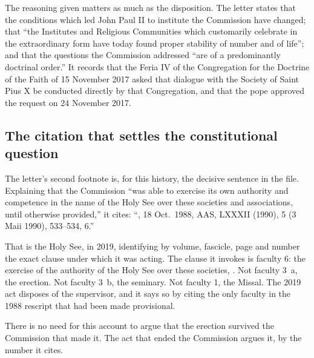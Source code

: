 The reasoning given matters as much as the disposition. The letter states
that the conditions which led John Paul II to institute the Commission
have changed; that ``the Institutes and Religious Communities which
customarily celebrate in the extraordinary form have today found proper
stability of number and of life''; and that the questions the Commission
addressed ``are of a predominantly doctrinal order.'' It records that the
Feria IV of the Congregation for the Doctrine of the Faith of 15 November
2017 asked that dialogue with the Society of Saint Pius X be conducted
directly by that Congregation, and that the pope approved the request on
24 November 2017.

\subsection{The citation that settles the constitutional question}

The letter's second footnote is, for this history, the decisive
sentence in the file. Explaining that the Commission ``was able to
exercise its own authority and competence in the name of the Holy See over
these societies and associations, until otherwise provided,'' it cites:
``, 18 Oct.\ 1988, AAS, LXXXII
(1990), 5 (3 Maii 1990), 533--534, 6.''

That is the Holy See, in 2019, identifying by volume, fascicle, page and
number the exact clause under which it was acting. The clause it invokes
is faculty 6: the exercise of the authority of the Holy See over these
societies, . Not faculty 3~a, the erection.
Not faculty 3~b, the seminary. Not faculty 1, the Missal. The 2019 act
disposes of the supervisor, and it says so by citing the only faculty in
the 1988 rescript that had been made provisional.

There is no need for this account to argue that the erection survived the
Commission that made it. The act that ended the Commission argues it, by
the number it cites.


